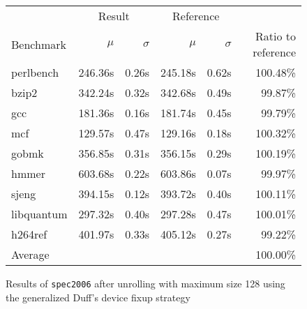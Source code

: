 \begin{figure}[th]
    \begin{center}
        \begin{tabular}{lrrrrr}
            \toprule
            & \multicolumn{2}{c}{Result} & \multicolumn{2}{c}{Reference}\\
            Benchmark & $\mu$ & $\sigma$ & $\mu$ & $\sigma$ & Ratio to reference\\
            \midrule
            perlbench & 246.36s & 0.26s & 245.18s & 0.62s & 100.48\%\\
            bzip2 & 342.24s & 0.32s & 342.68s & 0.49s & 99.87\%\\
            gcc & 181.36s & 0.16s & 181.74s & 0.45s & 99.79\%\\
            mcf & 129.57s & 0.47s & 129.16s & 0.18s & 100.32\%\\
            gobmk & 356.85s & 0.31s & 356.15s & 0.29s & 100.19\%\\
            hmmer & 603.68s & 0.22s & 603.86s & 0.07s & 99.97\%\\
            sjeng & 394.15s & 0.12s & 393.72s & 0.40s & 100.11\%\\
            libquantum & 297.32s & 0.40s & 297.28s & 0.47s & 100.01\%\\
            h264ref & 401.97s & 0.33s & 405.12s & 0.27s & 99.22\%\\
            \midrule
            Average & & & & & 100.00\%\\
            \bottomrule
        \end{tabular}
    \end{center}
    \caption{Results of \texttt{spec2006} after unrolling with maximum size 128 using the generalized Duff's device fixup strategy}
    \label{fig:eval:perf:duff:128}
\end{figure}
